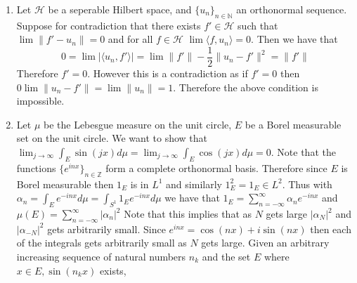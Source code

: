\documentclass[12pt, letterpaper]{article}
\newcommand{\Z}{\mathbb{Z}}
\newcommand{\N}{\mathbb{N}}
\begin{document}
\begin{enumerate}
	$|f_ng_n - f g|^2 \leq 2(|f_n|^2|g_n|^2 + |f|^2|g|^2) \leq 2C^2(|f_n|^2 + |f|^2)$.  
	\item Let $\mathcal{H}$ be a seperable Hilbert space, and $\{u_n\}_{n \in \N}$ an orthonormal sequence. 
	Suppose for contradiction that there exists 	$f' \in \mathcal{H}$ such that $\lim \|f' - u_n\| = 0$ and 
	for all $f \in \mathcal{H}$ $\lim \langle f, u_n\rangle = 0$.  Then we have that 
	$$
	0 = \lim | \langle u_n, f' \rangle | = \lim \| f'\| - \frac{1}{2} \| u_n - f'\|^2 	= \| f'\|
	$$
	Therefore $f' = 0$.  However this is a contradiction as if $f' = 0$ then 
	$0 \lim \| u_n - f'\| = \lim \| u_n\| = 1$.  Therefore the above condition is impossible.  
	\item Let $\mu$ be the Lebesgue measure on the unit circle, $E$ be a Borel measurable set on the unit circle. 
	We want to show that $\lim_{j \to \infty} \int_E \sin(jx)d \mu = \lim_{j \to \infty} \int_E \cos(jx)d \mu = 0$.
	Note that the functions $\{e^{inx}\}_{n \in \Z}$ form a complete orthonormal basis.  Therefore since 
	$E$ is Borel measurable then $1_E$ is in $L^1$ and similarly $1_E^2 = 1_E \in L^2$.  Thus 
	with $\alpha_n = \int_E e^{-inx}d \mu = \int_{S^1} 1_E e^{-inx}d \mu$ we have that 
	$1_E = \sum_{n = -\infty}^\infty \alpha_n e^{-inx}$ and $\mu(E) = \sum_{n = -\infty}^\infty |\alpha_n|^2$
	Note that this implies that as $N$ gets large $|\alpha_N|^2$ and $|\alpha_{-N}|^2$ gets arbitrarily small.  
	Since $e^{inx} = \cos(nx) + i \sin(nx)$ then each of the integrals gets arbitrarily small as $N$ gets large.
	Given an arbitrary increasing sequence of natural numbers $n_k$ and the set $E$ where 
	$x \in E, \sin(n_k x)$ exists, 
\end{enumerate}
\end{document}

